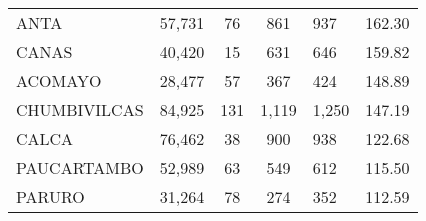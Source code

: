 \begin{tabular}{lrcclr}
	\cellcolor[HTML]{FFFF99}ANTA                                   & 57,731                                                         & 76                                                         & 861                  & 937                                                                 & 162.30                                                                       \\
	\cellcolor[HTML]{FFFF99}CANAS                                  & 40,420                                                         & 15                                                         & 631                  & 646                                                                 & 159.82                                                                       \\
	\cellcolor[HTML]{C6E0B4}ACOMAYO                                & 28,477                                                         & 57                                                         & 367                  & 424                                                                 & 148.89                                                                       \\
	\cellcolor[HTML]{C6E0B4}CHUMBIVILCAS                           & 84,925                                                         & 131                                                        & 1,119                & 1,250                                                               & 147.19                                                                       \\
	\cellcolor[HTML]{C6E0B4}CALCA                                  & 76,462                                                         & 38                                                         & 900                  & 938                                                                 & 122.68                                                                       \\
	\cellcolor[HTML]{C6E0B4}PAUCARTAMBO                            & 52,989                                                         & 63                                                         & 549                  & 612                                                                 & 115.50                                                                       \\
	\cellcolor[HTML]{C6E0B4}PARURO                                 & 31,264                                                         & 78                                                         & 274                  & 352                                                                 & 112.59                                                                       \\

\end{tabular}
